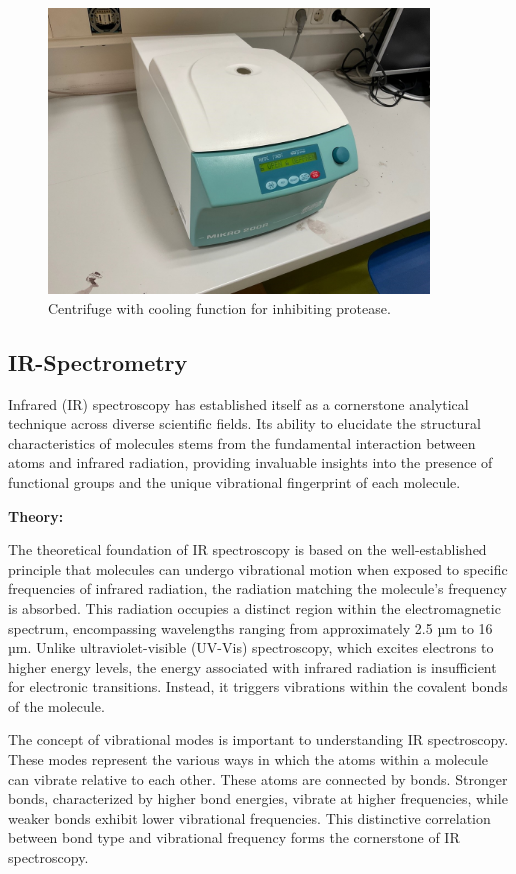 \begin{figure}[H]
    \centering
    \includegraphics[width=0.9\textwidth]{./media/images/centrifuge_cooling}
    \caption{Centrifuge with cooling function for inhibiting protease.}
    \label{fig:centrifuge_cooling}
\end{figure}


\subsection{IR-Spectrometry}
Infrared (IR) spectroscopy has established itself as a cornerstone analytical technique across diverse scientific fields.
Its ability to elucidate the structural characteristics of molecules stems from the fundamental interaction between atoms and infrared radiation, providing invaluable insights into the presence of functional groups and the unique vibrational fingerprint of each molecule.

\textbf{Theory:}

The theoretical foundation of IR spectroscopy is based on the well-established principle that molecules can undergo vibrational motion when exposed to specific frequencies of infrared radiation, the radiation matching the molecule's frequency is absorbed.
This radiation occupies a distinct region within the electromagnetic spectrum, encompassing wavelengths ranging from approximately 2.5 µm to 16 µm.
Unlike ultraviolet-visible (UV-Vis) spectroscopy, which excites electrons to higher energy levels, the energy associated with infrared radiation is insufficient for electronic transitions.
Instead, it triggers vibrations within the covalent bonds of the molecule.

The concept of vibrational modes is important to understanding IR spectroscopy.
These modes represent the various ways in which the atoms within a molecule can vibrate relative to each other.
These atoms are connected by bonds.
Stronger bonds, characterized by higher bond energies, vibrate at higher frequencies, while weaker bonds exhibit lower vibrational frequencies.
This distinctive correlation between bond type and vibrational frequency forms the cornerstone of IR spectroscopy.

